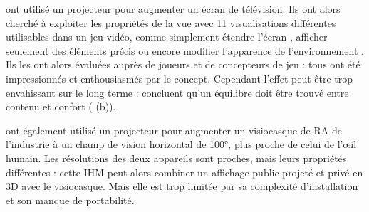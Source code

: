 
\cite{Jones2013} ont utilisé un projecteur pour augmenter un écran de télévision. Ils ont alors cherché à exploiter les propriétés de la vue  avec 11 visualisations différentes utilisables dans un jeu-vidéo, comme simplement étendre l'écran , afficher seulement des éléments précis  ou encore modifier l'apparence de l'environnement . Ils les ont alors évaluées auprès de joueurs et de concepteurs de jeu : tous ont été impressionnés et enthousiasmés par le concept. Cependant l'effet peut être trop envahissant sur le long terme : \cite{Jones2013} concluent qu'un équilibre doit être trouvé entre contenu et confort ( (b)).


\cite{Benko2015} ont également utilisé un projecteur pour augmenter un visiocasque de RA de l'industrie  à un champ de vision horizontal de \ang{100}, plus proche de celui de l'\oe il humain. Les résolutions des deux appareils sont proches, mais leurs propriétés différentes : cette IHM peut alors combiner un affichage public projeté et privé en 3D avec le visiocasque. Mais elle est trop limitée par sa complexité d'installation et son manque de portabilité.


